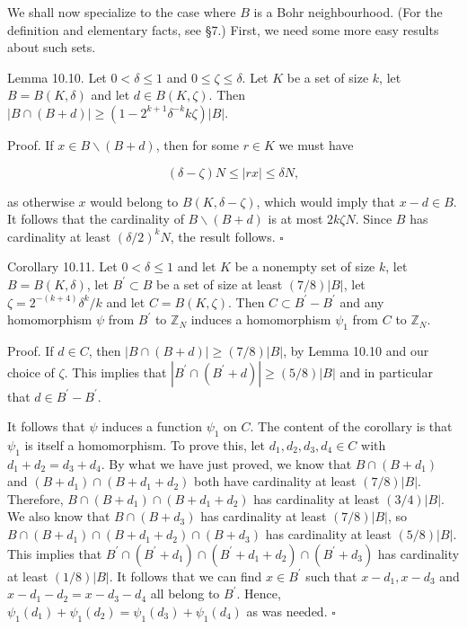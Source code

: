 \documentclass[10pt]{article}
\begin{document}
We shall now specialize to the case where $B$ is a Bohr neighbourhood. (For the definition and elementary facts, see §7.) First, we need some more easy results about such sets.

Lemma 10.10. Let $0<\delta\leqslant1$ and $0\leqslant\zeta\leqslant\delta$. Let $K$ be a set of size $k$, let $B=B(K, \delta)$ and let $d \in B(K, \zeta)$. Then $|B \cap(B+d)| \geqslant\left(1-2^{k+1} \delta^{-k} k \zeta\right)|B|$.

Proof. If $x \in B \backslash(B+d)$, then for some $r \in K$ we must have

$$
(\delta-\zeta) N \leqslant|r x| \leqslant \delta N,
$$

as otherwise $x$ would belong to $B(K, \delta-\zeta)$, which would imply that $x-d \in B$. It follows that the cardinality of $B \backslash(B+d)$ is at most $2 k \zeta N$. Since $B$ has cardinality at least $(\delta / 2)^{k} N$, the result follows. \(\square\)

Corollary 10.11. Let $0<\delta\leqslant1$ and let $K$ be a nonempty set of size $k$, let $B=B(K, \delta)$, let $B^{\prime} \subset B$ be a set of size at least $(7 / 8)|B|$, let $\zeta=2^{-(k+4)} \delta^{k}/k$ and let $C=B(K, \zeta)$. Then $C \subset B^{\prime}-B^{\prime}$ and any homomorphism $\psi$ from $B^{\prime}$ to $\mathbb{Z}_{N}$ induces a homomorphism $\psi_{1}$ from $C$ to $\mathbb{Z}_{N}$.

Proof. If $d \in C$, then $|B \cap(B+d)| \geqslant(7 / 8)|B|$, by Lemma 10.10 and our choice of $\zeta$. This implies that $\left|B^{\prime} \cap\left(B^{\prime}+d\right)\right| \geqslant(5 / 8)|B|$ and in particular that $d \in B^{\prime}-B^{\prime}$.

It follows that $\psi$ induces a function $\psi_{1}$ on $C$. The content of the corollary is that $\psi_{1}$ is itself a homomorphism. To prove this, let $d_{1}, d_{2}, d_{3}, d_{4} \in C$ with $d_{1}+d_{2}=d_{3}+d_{4}$. By what we have just proved, we know that $B \cap\left(B+d_{1}\right)$ and $\left(B+d_{1}\right) \cap\left(B+d_{1}+d_{2}\right)$ both have cardinality at least $(7 / 8)|B|$. Therefore, $B \cap\left(B+d_{1}\right) \cap\left(B+d_{1}+d_{2}\right)$ has cardinality at least $(3 / 4)|B|$. We also know that $B \cap\left(B+d_{3}\right)$ has cardinality at least $(7 / 8)|B|$, so $B \cap\left(B+d_{1}\right) \cap\left(B+d_{1}+d_{2}\right) \cap\left(B+d_{3}\right)$ has cardinality at least $(5 / 8)|B|$. This implies that $B^{\prime} \cap\left(B^{\prime}+d_{1}\right) \cap\left(B^{\prime}+d_{1}+d_{2}\right) \cap\left(B^{\prime}+d_{3}\right)$ has cardinality at least $(1 / 8)|B|$. It follows that we can find $x \in B^{\prime}$ such that $x-d_{1}, x-d_{3}$ and $x-d_{1}-d_{2}=x-d_{3}-d_{4}$ all belong to $B^{\prime}$. Hence, $\psi_{1}\left(d_{1}\right)+\psi_{1}\left(d_{2}\right)=\psi_{1}\left(d_{3}\right)+\psi_{1}\left(d_{4}\right)$ as was needed. \(\square\)
\end{document}
